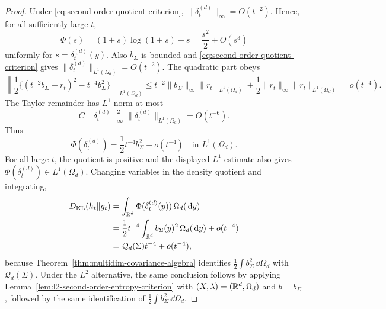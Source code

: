 \begin{proof}
Under \eqref{eq:second-order-quotient-criterion},
\(\|\delta_t^{(d)}\|_\infty=O(t^{-2})\).  Hence, for all sufficiently large
\(t\),
\[
\Phi(s)=(1+s)\log(1+s)-s=\frac{s^2}{2}+O(s^3)
\]
uniformly for \(s=\delta_t^{(d)}(y)\).  Also \(b_\Sigma\) is bounded and
\eqref{eq:second-order-quotient-criterion} gives
\(\|\delta_t^{(d)}\|_{L^1(\Omega_d)}=O(t^{-2})\).  The quadratic part obeys
\[
\left\|\frac12\{(t^{-2}b_\Sigma+r_t)^2-t^{-4}b_\Sigma^2\}\right\|_{L^1(\Omega_d)}
\le
t^{-2}\|b_\Sigma\|_\infty\|r_t\|_{L^1(\Omega_d)}
+\frac12\|r_t\|_\infty\|r_t\|_{L^1(\Omega_d)}
=o(t^{-4}).
\]
The Taylor remainder has \(L^1\)-norm at most
\[
C\|\delta_t^{(d)}\|_\infty^2\|\delta_t^{(d)}\|_{L^1(\Omega_d)}=O(t^{-6}).
\]
Thus
\[
\Phi(\delta_t^{(d)})=\frac12t^{-4}b_\Sigma^2+o(t^{-4})
\quad\text{in }L^1(\Omega_d).
\]
For all large \(t\), the quotient is positive and the displayed \(L^1\)
estimate also gives \(\Phi(\delta_t^{(d)})\in L^1(\Omega_d)\).  Changing
variables in the density quotient and integrating,
\[
\begin{aligned}
D_{\rm KL}(h_t\|g_t)
&=\int_{\mathbb{R}^d}\Phi(\delta_t^{(d)}(y))\,\Omega_d(\,\mathrm{d} y)\\
&=\frac12t^{-4}\int_{\mathbb{R}^d}b_\Sigma(y)^2\,\Omega_d(\,\mathrm{d} y)+o(t^{-4})\\
&=\mathcal Q_d(\Sigma)t^{-4}+o(t^{-4}),
\end{aligned}
\]
because Theorem~\ref{thm:multidim-covariance-algebra} identifies
\(\frac12\int b_\Sigma^2\,\dd\Omega_d\) with \(\mathcal Q_d(\Sigma)\).
Under the \(L^2\) alternative, the same conclusion follows
by applying Lemma~\ref{lem:l2-second-order-entropy-criterion} with
\((X,\lambda)=(\mathbb{R}^d,\Omega_d)\) and \(b=b_\Sigma\), followed by the same
identification of \(\frac12\int b_\Sigma^2\,\dd\Omega_d\).
\end{proof}

